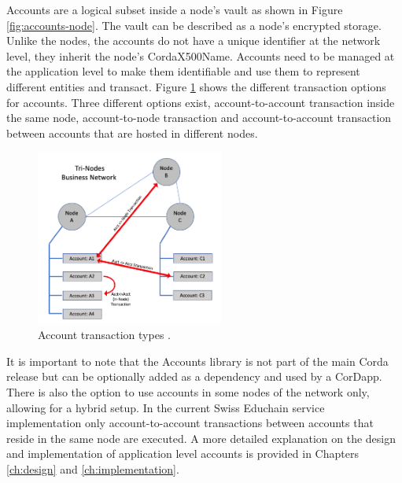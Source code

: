 Accounts are a logical subset inside a node's vault as shown in Figure \ref{fig:accounts-node}. The vault can be described as a node's encrypted storage. Unlike the nodes, the accounts do not have a unique identifier at the network level, they inherit the node's CordaX500Name. Accounts need to be managed at the application level to make them identifiable and use them to represent different entities and transact. Figure \ref{fig:accounts-transactions} shows the different transaction options for accounts. Three different options exist, account-to-account transaction inside the same node, account-to-node transaction and account-to-account transaction between accounts that are hosted in different nodes.

\begin{figure}[H]
	\centering
	\captionsetup{width=.8\linewidth}
	\includegraphics[width=0.55\textwidth]{figs/ch3/accounts-transactions}
	\caption{Account transaction types \cite{corda-accounts-library}.}
	\label{fig:accounts-transactions}
\end{figure} 

It is important to note that the Accounts library is not part of the main Corda release but can be optionally added as a dependency and used by a CorDapp. There is also the option to use accounts in some nodes of the network only, allowing for a hybrid setup. In the current Swiss Educhain service implementation only account-to-account transactions between accounts that reside in the same node are executed. A more detailed explanation on the design and implementation of application level accounts is provided in Chapters \ref{ch:design} and \ref{ch:implementation}.

